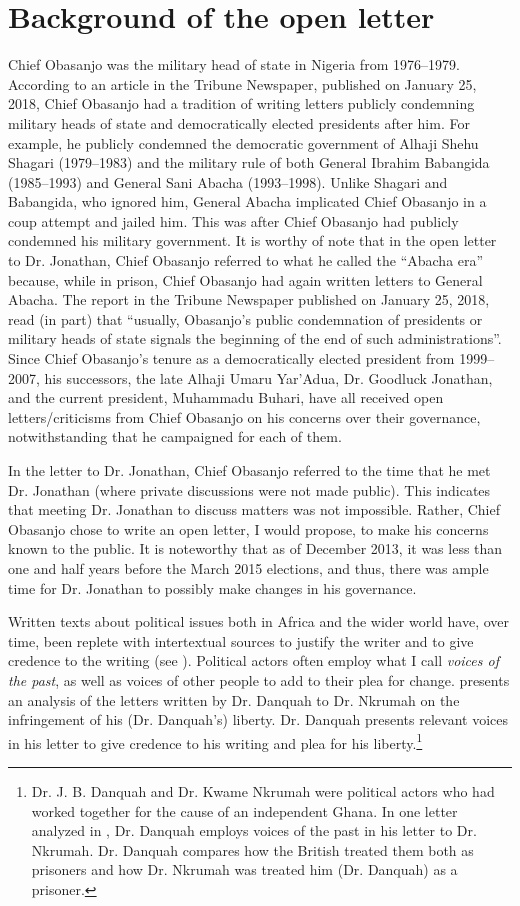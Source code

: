 \documentclass[output=paper,colorlinks,citecolor=brown]{langscibook}
\begin{document}
\section{Background of the open letter}

Chief Obasanjo was the military head of state in Nigeria from 1976–1979. According to an article in the Tribune Newspaper, published on January 25, 2018, Chief Obasanjo had a tradition of writing letters publicly condemning military heads of state and democratically elected presidents after him. For example, he publicly condemned the democratic government of Alhaji Shehu Shagari (1979–1983) and the military rule of both General Ibrahim Babangida (1985–1993) and General Sani Abacha (1993–1998). Unlike Shagari and Babangida, who ignored him, General Abacha implicated Chief Obasanjo in a coup attempt and jailed him. This was after Chief Obasanjo had publicly condemned his military government. It is worthy of note that in the open letter to Dr. Jonathan, Chief Obasanjo referred to what he called the “Abacha era” because, while in prison, Chief Obasanjo had again written letters to General Abacha. The report in the Tribune Newspaper published on January 25, 2018, read (in part) that “usually, Obasanjo’s public condemnation of presidents or military heads of state signals the beginning of the end of such administrations”. Since Chief Obasanjo’s tenure as a democratically elected president from 1999–2007, his successors, the late Alhaji Umaru Yar’Adua, Dr. Goodluck Jonathan, and the current president, Muhammadu Buhari, have all received open letters\slash criticisms from Chief Obasanjo on his concerns over their governance, notwithstanding that he campaigned for each of them. 

In the letter to Dr. Jonathan, Chief Obasanjo referred to the time that he met Dr. Jonathan (where private discussions were not made public). This indicates that meeting Dr. Jonathan to discuss matters was not impossible. Rather, Chief Obasanjo chose to write an open letter, I would propose, to make his concerns known to the public. It is noteworthy that as of December 2013, it was less than one and half years before the March 2015 elections, and thus, there was ample time for Dr. Jonathan to possibly make changes in his governance.

Written texts about political issues both in Africa and the wider world have, over time, been replete with intertextual sources to justify the writer and to give credence to the writing (see \cite{Obeng2016}). Political actors often employ what I call \textit{voices of the past}, as well as voices of other people to add to their plea for change. \citet{Obeng2020} presents an analysis of the letters written by Dr. Danquah to Dr. Nkrumah on the infringement of his (Dr. Danquah’s) liberty. Dr. Danquah presents relevant voices in his letter to give credence to his writing and plea for his liberty.\footnote{Dr. J. B. Danquah and Dr. Kwame Nkrumah were political actors who had worked together for the cause of an independent Ghana. In one letter analyzed in \citet{Obeng2020}, Dr. Danquah employs voices of the past in his letter to Dr. Nkrumah. Dr. Danquah compares how the British treated them both as prisoners and how Dr. Nkrumah was treated him (Dr. Danquah) as a prisoner.} 
\end{document}
